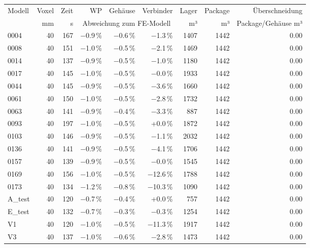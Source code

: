 \begin{tabular}{@{}lrrrrrrrr@{}}\toprule
Modell & Voxel & Zeit & WP & Gehäuse & Verbinder & Lager & Package & Überschneidung \\
 & mm & s & \multicolumn{3}{c}{Abweichung zum FE-Modell} & m³ & m³ & Package/Gehäuse m³ \\\midrule
0004 & \num{40} & \num{167} & −\num{0.9}\,\% & −\num{0.6}\,\% & −\num{1.3}\,\% & \num{1407} & \num{1442} & \num{0.00} \\
0008 & \num{40} & \num{151} & −\num{1.0}\,\% & −\num{0.5}\,\% & −\num{2.1}\,\% & \num{1469} & \num{1442} & \num{0.00} \\
0014 & \num{40} & \num{137} & −\num{0.9}\,\% & −\num{0.5}\,\% & −\num{1.0}\,\% & \num{1180} & \num{1442} & \num{0.00} \\
0017 & \num{40} & \num{145} & −\num{1.0}\,\% & −\num{0.5}\,\% & −\num{0.0}\,\% & \num{1933} & \num{1442} & \num{0.00} \\
0044 & \num{40} & \num{145} & −\num{0.9}\,\% & −\num{0.5}\,\% & −\num{3.6}\,\% & \num{1660} & \num{1442} & \num{0.00} \\
0061 & \num{40} & \num{150} & −\num{1.0}\,\% & −\num{0.5}\,\% & −\num{2.8}\,\% & \num{1732} & \num{1442} & \num{0.00} \\
0063 & \num{40} & \num{141} & −\num{0.9}\,\% & −\num{0.4}\,\% & −\num{3.3}\,\% & \num{887} & \num{1442} & \num{0.00} \\
0093 & \num{40} & \num{197} & −\num{1.0}\,\% & −\num{0.5}\,\% & +\num{0.0}\,\% & \num{1872} & \num{1442} & \num{0.00} \\
0103 & \num{40} & \num{146} & −\num{0.9}\,\% & −\num{0.5}\,\% & −\num{1.1}\,\% & \num{2032} & \num{1442} & \num{0.00} \\
0136 & \num{40} & \num{141} & −\num{0.9}\,\% & −\num{0.5}\,\% & −\num{4.1}\,\% & \num{1706} & \num{1442} & \num{0.00} \\
0157 & \num{40} & \num{139} & −\num{0.9}\,\% & −\num{0.5}\,\% & −\num{0.0}\,\% & \num{1545} & \num{1442} & \num{0.00} \\
0169 & \num{40} & \num{156} & −\num{1.0}\,\% & −\num{0.5}\,\% & −\num{12.6}\,\% & \num{1788} & \num{1442} & \num{0.00} \\
0173 & \num{40} & \num{134} & −\num{1.2}\,\% & −\num{0.8}\,\% & −\num{10.3}\,\% & \num{1090} & \num{1442} & \num{0.00} \\
A\_test & \num{40} & \num{120} & −\num{0.7}\,\% & −\num{0.4}\,\% & +\num{0.0}\,\% & \num{757} & \num{1442} & \num{0.00} \\
E\_test & \num{40} & \num{132} & −\num{0.7}\,\% & −\num{0.3}\,\% & −\num{0.3}\,\% & \num{1254} & \num{1442} & \num{0.00} \\
V1 & \num{40} & \num{120} & −\num{1.0}\,\% & −\num{0.5}\,\% & −\num{11.3}\,\% & \num{1917} & \num{1442} & \num{0.00} \\
V3 & \num{40} & \num{137} & −\num{1.0}\,\% & −\num{0.6}\,\% & −\num{2.8}\,\% & \num{1473} & \num{1442} & \num{0.00} \\
\bottomrule\end{tabular}
